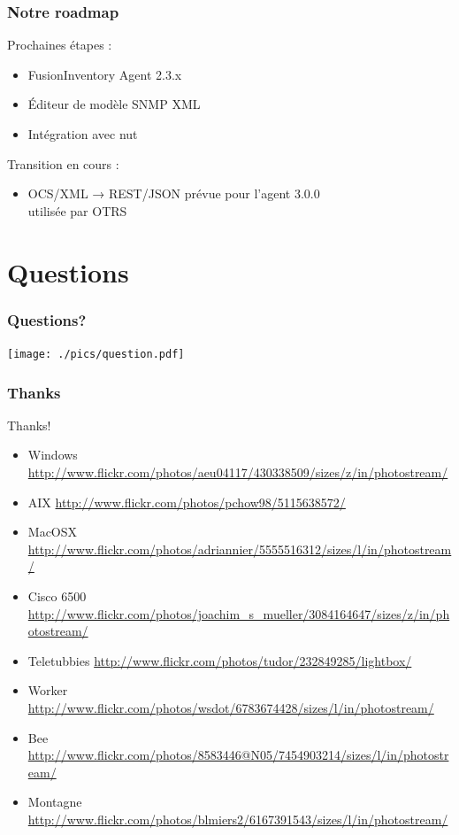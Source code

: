 \documentclass{beamer}
\begin{document}
\begin{frame}
    \frametitle{Notre roadmap}

    Prochaines étapes :
    \begin{itemize}
        \item FusionInventory Agent 2.3.x
        \item \'{E}diteur de modèle SNMP XML
        \item Intégration avec nut 
    \end{itemize}

    Transition en cours :
    \begin{itemize}
        \item OCS/XML → REST/JSON
        \small{prévue pour l'agent 3.0.0\\utilisée par OTRS}
    \end{itemize}

\end{frame}


\section{Questions}

\begin{frame}
    \frametitle{Questions?}

    \begin{center}

    \texttt{[image: ./pics/question.pdf]}

    \end{center}

\end{frame}

\begin{frame}
    \frametitle{Thanks}

    \begin{block}{Thanks!}
        \begin{itemize}
            \item Windows \url{http://www.flickr.com/photos/aeu04117/430338509/sizes/z/in/photostream/}
            \item AIX \url{http://www.flickr.com/photos/pchow98/5115638572/}
            \item MacOSX \url{http://www.flickr.com/photos/adriannier/5555516312/sizes/l/in/photostream/}
            \item Cisco 6500 \url{http://www.flickr.com/photos/joachim\_s\_mueller/3084164647/sizes/z/in/photostream/}
            \item Teletubbies \url{http://www.flickr.com/photos/tudor/232849285/lightbox/}
            \item Worker \url{http://www.flickr.com/photos/wsdot/6783674428/sizes/l/in/photostream/}
            \item Bee \url{http://www.flickr.com/photos/8583446@N05/7454903214/sizes/l/in/photostream/}
            \item Montagne \url{http://www.flickr.com/photos/blmiers2/6167391543/sizes/l/in/photostream/} 
        \end{itemize}
    \end{block}
\end{frame}
\end{document}
